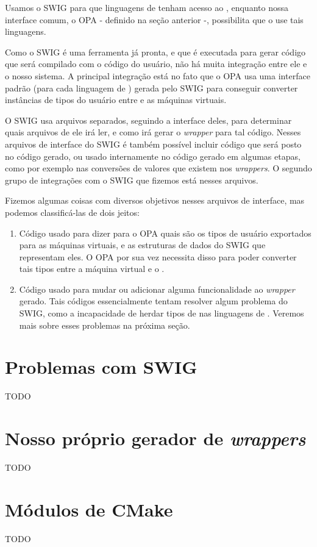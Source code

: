   
  Usamos o SWIG para que linguagens de \script{} tenham acesso ao \CXX{}, enquanto nossa interface
  comum, o OPA - definido na seção anterior -, possibilita que o \CXX{} use tais linguagens.
  
  Como o SWIG é uma ferramenta já pronta, e que é executada para gerar código que será compilado
  com o código do usuário, não há muita integração entre ele e o nosso sistema. A principal
  integração está no fato que o OPA usa uma interface padrão (para cada linguagem de \script{})
  gerada pelo SWIG para conseguir converter instâncias de tipos do usuário entre \CXX{} e as
  máquinas virtuais.
  
  O SWIG usa arquivos separados, seguindo a interface deles, para determinar quais arquivos
  de \CXX{} ele irá ler, e como irá gerar o \textit{wrapper} para tal código. Nesses arquivos
  de interface do SWIG é também possível incluir código que será posto no código gerado, ou usado
  internamente no código gerado em algumas etapas, como por exemplo nas conversões de valores
  que existem nos \textit{wrappers}. O segundo grupo de integrações com o SWIG que fizemos está
  nesses arquivos.
  
  Fizemos algumas coisas com diversos objetivos nesses arquivos de interface, mas podemos
  classificá-las de dois jeitos:
  \begin{enumerate}
    \item Código usado para dizer para o OPA quais são os tipos de usuário exportados para
      as máquinas virtuais, e as estruturas de dados do SWIG que representam eles. O OPA
      por sua vez necessita disso para poder converter tais tipos entre a máquina virtual
      e o \CXX{}.
    \item Código usado para mudar ou adicionar alguma funcionalidade ao \textit{wrapper}
      gerado. Tais códigos essencialmente tentam resolver algum problema do SWIG, como
      a incapacidade de herdar tipos de \CXX{} nas linguagens de \script{}. Veremos mais
      sobre esses problemas na próxima seção.
  \end{enumerate}
  
  
  \section{Problemas com SWIG}
  
  TODO
  
  \section{Nosso próprio gerador de \emph{wrappers}}
  
  TODO
  
  \section{Módulos de CMake}
  
  TODO
